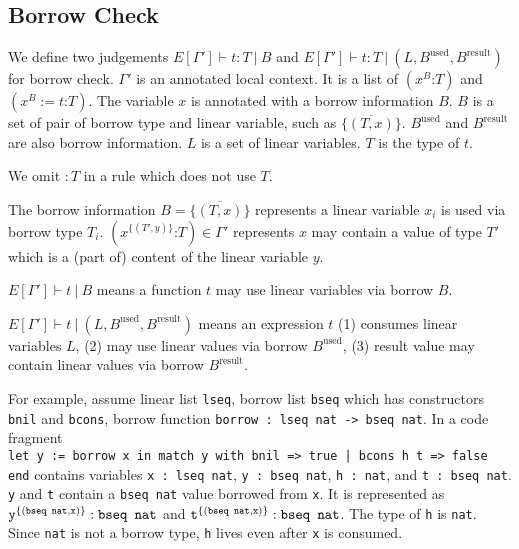 \documentclass[a4paper,fleqn]{article}
\newcommand{\lassum}[2]{(#1\mathord{:}#2)}
\newcommand{\ldef}[3]{(#1:=#2\mathord{:}#3)}
\begin{document}
\subsection{Borrow Check}\label{sec:borrow-check}

We define two judgements $E[\Gamma'] \vdash t:T~|~B$ and $E[\Gamma'] \vdash t:T~|~(L, B^\text{used}, B^\text{result})$ for borrow check.
$\Gamma'$ is an annotated local context.
It is a list of $\lassum{x^B}{T}$ and $\ldef{x^B}{t}{T}$.
The variable $x$ is annotated with a borrow information $B$.
$B$ is a set of pair of borrow type and linear variable, such as $\{\overline{(T,x)}\}$.
$B^\text{used}$ and $B^\text{result}$ are also borrow information.
$L$ is a set of linear variables.
$T$ is the type of $t$.

We omit $:T$ in a rule which does not use $T$.

The borrow information $B=\{\overline{(T,x)}\}$ represents a linear variable $x_i$ is used via borrow type $T_i$.
$\lassum{x^{\{(T',y)\}}}{T}\in \Gamma'$ represents $x$ may contain a value of type $T'$ which is a (part of) content of the linear variable $y$.

$E[\Gamma'] \vdash t~|~B$ means a function $t$ may use linear variables via borrow $B$.

$E[\Gamma'] \vdash t~|~(L, B^\text{used}, B^\text{result})$ means an expression $t$
(1) consumes linear variables $L$,
(2) may use linear values via borrow $B^\text{used}$,
(3) result value may contain linear values via borrow $B^\text{result}$.

For example, assume linear list \lstinline!lseq!, borrow list \lstinline!bseq! which has constructors \lstinline!bnil! and \lstinline!bcons!,
borrow function \lstinline!borrow : lseq nat -> bseq nat!.
In a code fragment \\
\lstinline!let y := borrow x in match y with bnil => true | bcons h t => false end! contains variables
\lstinline!x : lseq nat!,
\lstinline!y : bseq nat!,
\lstinline!h : nat!, and
\lstinline!t : bseq nat!.
\texttt{y} and \texttt{t} contain a \texttt{bseq nat} value borrowed from \texttt{x}.
It is represented as
$\texttt{y}^{\{(\texttt{bseq nat},\texttt{x})\}}:\text{\texttt{bseq nat}}$ and
$\texttt{t}^{\{(\texttt{bseq nat},\texttt{x})\}}:\text{\texttt{bseq nat}}$.
The type of \texttt{h} is \texttt{nat}.
Since \texttt{nat} is not a borrow type, \texttt{h} lives even after \texttt{x} is consumed.
\end{document}
